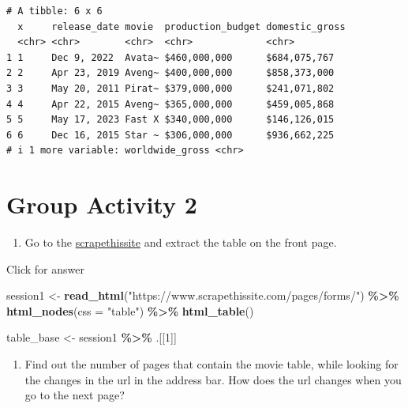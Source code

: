 \documentclass[
]{book}
\newenvironment{Shaded}{\begin{snugshade}}{\end{snugshade}}
\newcommand{\AttributeTok}[1]{\textcolor[rgb]{0.13,0.29,0.53}{#1}}
\newcommand{\DecValTok}[1]{\textcolor[rgb]{0.00,0.00,0.81}{#1}}
\newcommand{\FunctionTok}[1]{\textcolor[rgb]{0.13,0.29,0.53}{\textbf{#1}}}
\newcommand{\NormalTok}[1]{#1}
\newcommand{\OtherTok}[1]{\textcolor[rgb]{0.56,0.35,0.01}{#1}}
\newcommand{\SpecialCharTok}[1]{\textcolor[rgb]{0.81,0.36,0.00}{\textbf{#1}}}
\newcommand{\StringTok}[1]{\textcolor[rgb]{0.31,0.60,0.02}{#1}}
\providecommand{\tightlist}{%
  \setlength{\itemsep}{0pt}\setlength{\parskip}{0pt}}
\begin{document}
\begin{verbatim}
# A tibble: 6 x 6
  x     release_date movie  production_budget domestic_gross
  <chr> <chr>        <chr>  <chr>             <chr>         
1 1     Dec 9, 2022  Avata~ $460,000,000      $684,075,767  
2 2     Apr 23, 2019 Aveng~ $400,000,000      $858,373,000  
3 3     May 20, 2011 Pirat~ $379,000,000      $241,071,802  
4 4     Apr 22, 2015 Aveng~ $365,000,000      $459,005,868  
5 5     May 17, 2023 Fast X $340,000,000      $146,126,015  
6 6     Dec 16, 2015 Star ~ $306,000,000      $936,662,225  
# i 1 more variable: worldwide_gross <chr>
\end{verbatim}

\hypertarget{group-activity-2-4}{%
\section{Group Activity 2}\label{group-activity-2-4}}

\begin{enumerate}
\def\labelenumi{\arabic{enumi}.}
\tightlist
\item
  Go to the \href{https://www.scrapethissite.com/pages/forms/}{scrapethissite} and extract the table on the front page.
\end{enumerate}

Click for answer

\begin{Shaded}
\begin{Highlighting}[]
\NormalTok{session1 }\OtherTok{\textless{}{-}} \FunctionTok{read\_html}\NormalTok{(}\StringTok{"https://www.scrapethissite.com/pages/forms/"}\NormalTok{) }\SpecialCharTok{\%\textgreater{}\%}
  \FunctionTok{html\_nodes}\NormalTok{(}\AttributeTok{css =} \StringTok{"table"}\NormalTok{) }\SpecialCharTok{\%\textgreater{}\%}
  \FunctionTok{html\_table}\NormalTok{()}

\NormalTok{table\_base }\OtherTok{\textless{}{-}}\NormalTok{ session1 }\SpecialCharTok{\%\textgreater{}\%}\NormalTok{ .[[}\DecValTok{1}\NormalTok{]]}
\end{Highlighting}
\end{Shaded}

\begin{enumerate}
\def\labelenumi{\arabic{enumi}.}
\setcounter{enumi}{1}
\tightlist
\item
  Find out the number of pages that contain the movie table, while looking for the changes in the url in the address bar. How does the url changes when you go to the next page?
\end{enumerate}
\end{document}
